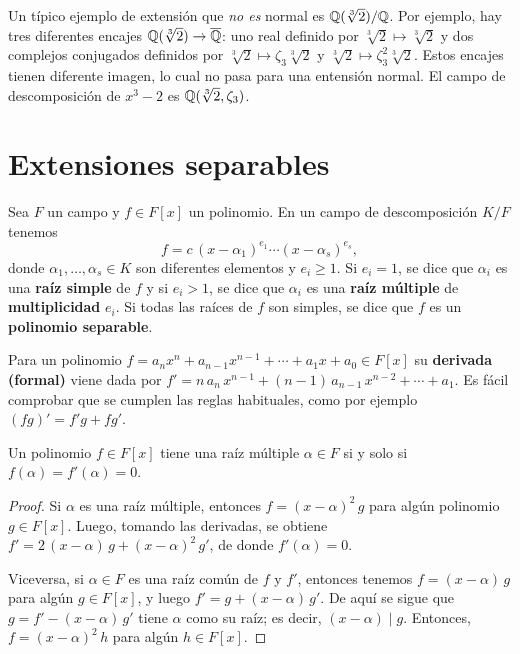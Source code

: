 Un típico ejemplo de extensión que \emph{no es} normal es
$\mathbb{Q} (\sqrt[3]{2})/\mathbb{Q}$. Por ejemplo, hay tres diferentes encajes
$\mathbb{Q} (\sqrt[3]{2}) \to \overline{\mathbb{Q}}$: uno real definido por
$\sqrt[3]{2} \mapsto \sqrt[3]{2}$ y dos complejos conjugados definidos por
$\sqrt[3]{2} \mapsto \zeta_3\sqrt[3]{2}$ y
$\sqrt[3]{2} \mapsto \zeta_3^2\sqrt[3]{2}$. Estos encajes tienen diferente
imagen, lo cual no pasa para una entensión normal. El campo de descomposición
de $x^3 - 2$ es $\mathbb{Q} (\sqrt[3]{2}, \zeta_3)$.


\section{Extensiones separables}

\begin{definicion}
  Sea $F$ un campo y $f\in F [x]$ un polinomio. En un campo de descomposición
  $K/F$ tenemos
  $$f = c\,(x-\alpha_1)^{e_1} \cdots (x - \alpha_s)^{e_s},$$
  donde $\alpha_1,\ldots,\alpha_s \in K$ son diferentes elementos y
  $e_i \ge 1$. Si $e_i = 1$, se dice que $\alpha_i$ es una \textbf{raíz simple} de
  $f$ y si $e_i > 1$, se dice que $\alpha_i$ es una \textbf{raíz múltiple} de
  \textbf{multiplicidad} $e_i$. Si todas las raíces de $f$ son simples, se dice
  que $f$ es un \textbf{polinomio separable}.
\end{definicion}

Para un polinomio
$f = a_n x^n + a_{n-1} x^{n-1} + \cdots + a_1 x + a_0 \in F [x]$
su \textbf{derivada (formal)} viene dada por
$f' = n\,a_n\,x^{n-1} + (n-1)\,a_{n-1}\,x^{n-2} + \cdots + a_1$.
Es fácil comprobar que se cumplen las reglas habituales, como por ejemplo
$(fg)' = f' g + f g'$.

\begin{proposicion}
  Un polinomio $f \in F [x]$ tiene una raíz múltiple $\alpha \in F$ si y solo si
  $f (\alpha) = f' (\alpha) = 0$.

  \begin{proof}
    Si $\alpha$ es una raíz múltiple, entonces $f = (x-\alpha)^2\,g$ para algún
    polinomio $g\in F [x]$. Luego, tomando las derivadas, se obtiene
    $f' = 2\,(x-\alpha)\,g + (x-\alpha)^2\,g'$, de donde $f' (\alpha) = 0$.

    Viceversa, si $\alpha \in F$ es una raíz común de $f$ y $f'$, entonces
    tenemos $f = (x-\alpha)\,g$ para algún $g \in F [x]$, y luego
    $f' = g + (x-\alpha)\,g'$.  De aquí se sigue que $g = f' - (x-\alpha)\,g'$
    tiene $\alpha$ como su raíz; es decir, $(x - \alpha) \mid g$. Entonces,
    $f = (x-\alpha)^2\,h$ para algún $h\in F [x]$.
  \end{proof}
\end{proposicion}

